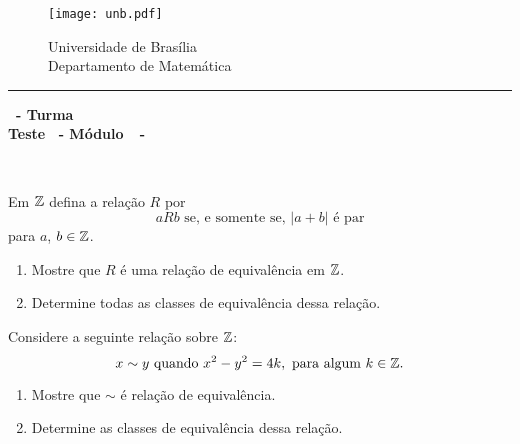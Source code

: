 \documentclass[12pt]{exam}
\begin{document}
    \begin{figure}[h]
        \begin{minipage}[c]{1.7cm}
            \texttt{[image: unb.pdf]}
        \end{minipage}
        \hspace{0pt}
        \begin{minipage}[c]{4in}
            {Universidade de Brasília} \\
            {Departamento de Matemática}
        \end{minipage}
    \end{figure}
    \hrule
    \begin{center}
        {\Large\bf \disciplina\ - Turma \turma}  \\
         {\large\bf Teste \numeroteste\ - Módulo\ \modulo\ -\ \dataavaliacao}
    \end{center}

    \\
    \vspace*{.01cm}

    \vspace{.4cm}

    \questao{} Em $\mathbb{Z}$ defina a relação $R$ por
    \[
    a R b \mbox{ se, e somente se, } |a + b| \mbox{ é par}
    \]
    para $a$, $b \in \mathbb{Z}$.
    \begin{enumerate}[label={\alph*})]
        \item Mostre que $R$ é uma relação de equivalência em $\mathbb{Z}$.

        \item Determine todas as classes de equivalência dessa relação.
    \end{enumerate}

    \vspace*{.75cm}

    \questao{} Considere a seguinte relação sobre $\mathbb{Z}$:
    \[
    x \sim y \mbox{ quando }  x^2 - y^2 = 4k, \mbox{ para algum } k \in \mathbb{Z}.
    \]

    \begin{enumerate}[label={\alph*})]
        \item Mostre que $\sim$ é relação de equivalência.

        \item Determine as classes de equivalência dessa relação.
    \end{enumerate}
\end{document}
